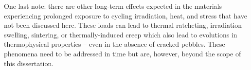 One last note: there are other long-term effects expected in the materials experiencing prolonged exposure to cycling irradiation, heat, and stress that have not been discussed here. These loads can lead to thermal ratcheting, irradiation swelling, sintering, or thermally-induced creep which also lead to evolutions in thermophysical properties -- even in the absence of cracked pebbles. These phenomena need to be addressed in time but are, however, beyond the scope of this dissertation. 


